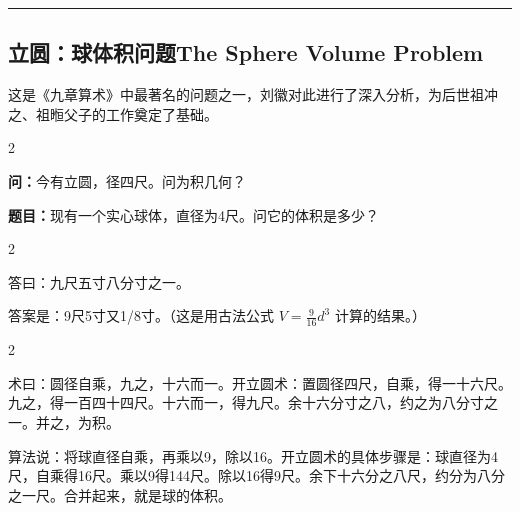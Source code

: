 \documentclass[11pt,a4paper]{article}
\newcommand{\longline}{\noindent\rule{\textwidth}{0.4pt}}
\newcommand{\bilingualsubsection}[2]{%
  \subsection{#1\hfill\normalfont\normalsize\color{sectioncolor}#2}%
}
\begin{document}
\vspace{0.5cm}
\longline
\vspace{0.3cm}

\bilingualsubsection{立圆：球体积问题}{The Sphere Volume Problem}

这是《九章算术》中最著名的问题之一，刘徽对此进行了深入分析，为后世祖冲之、祖暅父子的工作奠定了基础。

\begin{paracol}{2}

\begin{problembox}[\CJKfamily{rm}立圆 · 原文]
\textbf{问：}今有立圆，径四尺。问为积几何？
\end{problembox}

\switchcolumn

\begin{problembox}
\textbf{题目：}现有一个实心球体，直径为4尺。问它的体积是多少？
\end{problembox}

\end{paracol}

\vspace{0.2cm}

\begin{paracol}{2}

\begin{answerbox}[\CJKfamily{rm}答 · 原文]
答曰：九尺五寸八分寸之一。
\end{answerbox}

\switchcolumn

\begin{answerbox}[白话文：答案]
答案是：9尺5寸又1/8寸。（这是用古法公式 $V = \frac{9}{16}d^3$ 计算的结果。）
\end{answerbox}

\end{paracol}

\vspace{0.2cm}

\begin{paracol}{2}

\begin{methodbox}[\CJKfamily{rm}术 · 原文]
术曰：圆径自乘，九之，十六而一。开立圆术：置圆径四尺，自乘，得一十六尺。九之，得一百四十四尺。十六而一，得九尺。余十六分寸之八，约之为八分寸之一。并之，为积。
\end{methodbox}

\switchcolumn

\begin{methodbox}
算法说：将球直径自乘，再乘以9，除以16。开立圆术的具体步骤是：球直径为4尺，自乘得16尺。乘以9得144尺。除以16得9尺。余下十六分之八尺，约分为八分之一尺。合并起来，就是球的体积。
\end{methodbox}

\end{paracol}
\end{document}
